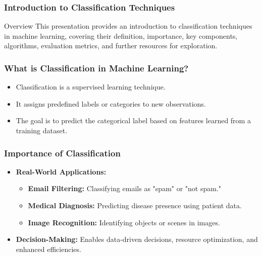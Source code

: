 \documentclass[aspectratio=169]{beamer}
\begin{document}
\frame{\titlepage}

\begin{frame}[fragile]
    \frametitle{Introduction to Classification Techniques}
    \begin{block}{Overview}
        This presentation provides an introduction to classification techniques in machine learning, covering their definition, importance, key components, algorithms, evaluation metrics, and further resources for exploration.
    \end{block}
\end{frame}

\begin{frame}[fragile]
    \frametitle{What is Classification in Machine Learning?}
    \begin{itemize}
        \item Classification is a supervised learning technique.
        \item It assigns predefined labels or categories to new observations.
        \item The goal is to predict the categorical label based on features learned from a training dataset.
    \end{itemize}
\end{frame}

\begin{frame}[fragile]
    \frametitle{Importance of Classification}
    \begin{itemize}
        \item \textbf{Real-World Applications:}
        \begin{itemize}
            \item \textbf{Email Filtering:} Classifying emails as "spam" or "not spam."
            \item \textbf{Medical Diagnosis:} Predicting disease presence using patient data.
            \item \textbf{Image Recognition:} Identifying objects or scenes in images.
        \end{itemize}
        
        \item \textbf{Decision-Making:} Enables data-driven decisions, resource optimization, and enhanced efficiencies.
    \end{itemize}
\end{frame}
\end{document}
